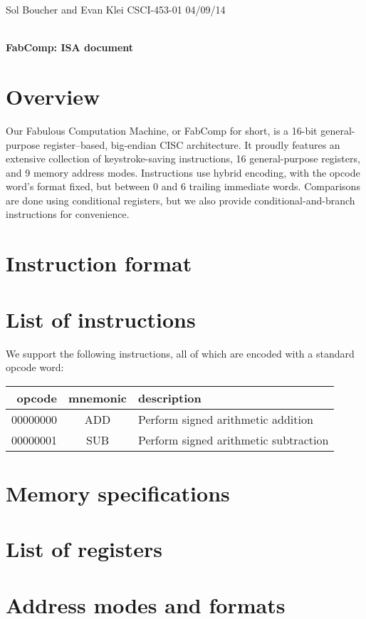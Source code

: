 \documentclass[12pt]{article}
\begin{document}
\begin{framed}
\noindent
Sol Boucher and Evan Klei \hfill CSCI-453-01 \hfill 04/09/14 \\
\vspace{6pt} \\
\centerline{\textbf{\huge FabComp: ISA document}}
\end{framed}

\section{Overview}
Our Fabulous Computation Machine, or FabComp for short, is a 16-bit general-purpose register--based, big-endian CISC architecture.
It proudly features an extensive collection of keystroke-saving instructions, 16 general-purpose registers, and 9 memory address modes.
Instructions use hybrid encoding, with the opcode word's format fixed, but between 0 and 6 trailing immediate words.
Comparisons are done using conditional registers, but we also provide conditional-and-branch instructions for convenience.

\section{Instruction format}

\section{List of instructions}
We support the following instructions, all of which are encoded with a standard opcode word:

\vspace{6pt}
\begin{tabular}{| r | c | l |}
\hline
\textbf{opcode} & \textbf{mnemonic} & \textbf{description} \\
\hline
00000000 & ADD & Perform signed arithmetic addition \\
00000001 & SUB & Perform signed arithmetic subtraction \\
\hline
\end{tabular}

\section{Memory specifications}

\section{List of registers}

\section{Address modes and formats}
\end{document}
